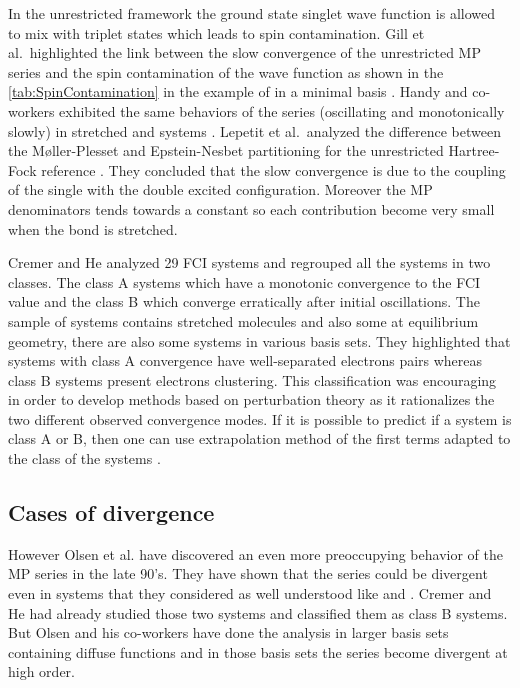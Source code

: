 \documentclass[11pt,a4paper]{article}
\begin{document}
In the unrestricted framework the ground state singlet wave function is allowed to mix with triplet states which leads to spin contamination. Gill et al.~highlighted the link between the slow convergence of the unrestricted MP series and the spin contamination of the wave function as shown in the \autoref{tab:SpinContamination} in the example of  in a minimal basis \cite{Gill_1988}. 
Handy and co-workers exhibited the same behaviors of the series (oscillating and monotonically slowly) in stretched  and  systems \cite{Handy_1985}. Lepetit et al.~analyzed the difference between the M{\o}ller-Plesset and Epstein-Nesbet partitioning for the unrestricted Hartree-Fock reference \cite{Lepetit_1988}. They concluded that the slow convergence is due to the coupling of the single with the double excited configuration. Moreover the MP denominators tends towards a constant so each contribution become very small when the bond is stretched.

Cremer and He analyzed 29 FCI systems \cite{Cremer_1996} and regrouped all the systems in two classes. The class A systems which have a monotonic convergence to the FCI value and the class B which converge erratically after initial oscillations. The sample of systems contains stretched molecules and also some at equilibrium geometry, there are also some systems in various basis sets. They highlighted that systems with class A convergence have well-separated electrons pairs whereas class B systems present electrons clustering. This classification was encouraging in order to develop methods based on perturbation theory as it rationalizes the two different observed convergence modes. If it is possible to predict if a system is class A or B, then one can use extrapolation method of the first terms adapted to the class of the systems \cite{Cremer_1996}.

\subsection{Cases of divergence}

However Olsen et al. have discovered an even more preoccupying behavior of the MP series in the late 90's. They have shown that the series could be divergent even in systems that they considered as well understood like  and  \cite{Olsen_1996, Christiansen_1996}. Cremer and He had already studied those two systems and classified them as class B systems. But Olsen and his co-workers have done the analysis in larger basis sets containing diffuse functions and in those basis sets the series become divergent at high order.
\end{document}
